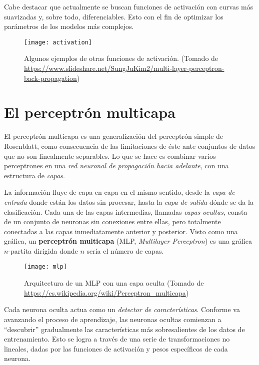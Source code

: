 Cabe destacar que actualmente se buscan funciones de activación con
curvas más suavizadas y, sobre todo, diferenciables. Esto con el fin
de optimizar los parámetros de los modelos más complejos.

\begin{center}
\begin{figure}[H]
  \texttt{[image: activation]} \centering
  \caption{Algunos ejemplos de otras funciones de activación.  (Tomado
    de
    \url{https://www.slideshare.net/SungJuKim2/multi-layer-perceptron-back-propagation})}
\end{figure}
\end{center}

\section{El perceptrón multicapa}
El perceptrón multicapa es una generalización del perceptrón simple de
Rosenblatt, como consecuencia de las limitaciones de éste ante
conjuntos de datos que no son linealmente separables. Lo que se hace
es combinar varios perceptrones en una \textit{red neuronal de
  propagación hacia adelante}, con una estructura de \textit{capas}.

La información fluye de capa en capa en el mismo sentido, desde la
\textit{capa de entrada} donde están los datos sin procesar, hasta la
\textit{capa de salida} dónde se da la clasificación. Cada una de las capas
intermedias, llamadas \textit{capas ocultas}, consta de un conjunto de
neuronas sin conexiones entre ellas, pero totalmente conectadas a las
capas inmediatamente anterior y posterior. Visto como una gráfica, un
\textbf{perceptrón multicapa} (MLP, \textit{Multilayer Perceptron})
es una gráfica $n$-partita dirigida donde $n$ sería el número de
capas.
\begin{figure}[H]
  \texttt{[image: mlp]} \centering \caption{Arquitectura de
  un MLP con una capa oculta (Tomado de \url{https://es.wikipedia.org/wiki/Perceptron_multicapa})}
\end{figure}
Cada neurona oculta actua como un \textit{detector de
  características}. Conforme va avanzando el proceso de aprendizaje,
las neuronas ocultas comienzan a ``descubrir'' gradualmente las
características más sobresalientes de los datos de entrenamiento.
Esto se logra a través de una serie de transformaciones no lineales,
dadas por las funciones de activación y pesos específicos de cada
neurona.

